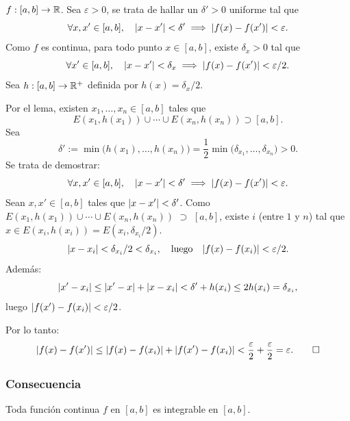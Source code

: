 \documentclass[11pt,a4paper]{article}
\begin{document}
\begin{demo}
$f:[a,b]\to\mathbb{R}$. Sea $\varepsilon>0$, se trata de hallar un $\delta'>0$ uniforme tal que
\[
  \forall x,x'\in[a,b],\quad \lvert x-x'\rvert<\delta'\implies\lvert f(x)-f(x')\rvert<\varepsilon.
\]
Como $f$ es continua, para todo punto $x\in[a,b]$, existe $\delta_x>0$ tal que
\[
  \forall x'\in[a,b],\quad \lvert x-x'\rvert<\delta_x\implies\lvert f(x)-f(x')\rvert<\varepsilon/2.
\]
Sea $h:[a,b]\to\mathbb{R}^+$ definida por $h(x)=\delta_x/2$.

Por el lema, existen $x_1,\dots,x_n\in[a,b]$ tales que
\[
  E(x_1,h(x_1))\cup\cdots\cup E(x_n,h(x_n))\supset[a,b].
\]
Sea
\[
  \delta':=\min\big(h(x_1),\dots,h(x_n)\big)=\frac12\min\big(\delta_{x_1},\dots,\delta_{x_n}\big)>0.
\]
Se trata de demostrar:
\[
  \forall x,x'\in[a,b],\quad \lvert x-x'\rvert<\delta'\implies\lvert f(x)-f(x')\rvert<\varepsilon.
\]
Sean $x,x'\in[a,b]$ tales que $\lvert x-x'\rvert<\delta'$. Como $E(x_1,h(x_1))\cup\cdots\cup E(x_n,h(x_n))$ $\supset$ $[a,b]$, existe $i$ (entre $1$ y $n$) tal que $x\in E(x_i,h(x_i))=E(x_i,\delta_{x_i}/2)$.
\[
  \lvert x-x_i\rvert<\delta_{x_i}/2<\delta_{x_i},\quad\text{luego}\quad \lvert f(x)-f(x_i)\rvert<\varepsilon/2.
\]
Además:
\[
  \lvert x'-x_i\rvert\leq\lvert x'-x\rvert+\lvert x-x_i\rvert<\delta'+h(x_i)\leq2h(x_i)=\delta_{x_i},
\]
luego $\lvert f(x')-f(x_i)\rvert<\varepsilon/2$.

Por lo tanto:
\[
  \lvert f(x)-f(x')\rvert\leq\lvert f(x)-f(x_i)\rvert+\lvert f(x')-f(x_i)\rvert<\frac\varepsilon2+\frac\varepsilon2=\varepsilon. \qedhere
\]
\end{demo}

\subsubsection*{Consecuencia}

\begin{proposicion}
Toda función continua $f$ en $[a,b]$ es integrable en $[a,b]$.
\end{proposicion}
\end{document}
